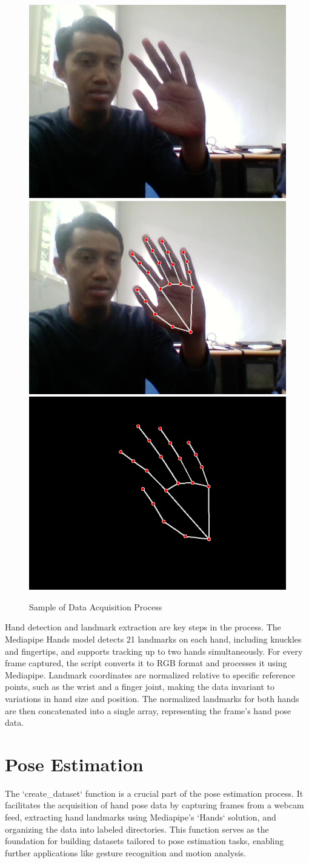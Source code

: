 \begin{figure}[h]
	\centering
	\includegraphics[width=0.3\linewidth]{img/data_cap1} 
	\includegraphics[width=0.3\linewidth]{img/data_cap2}
	\includegraphics[width=0.3\linewidth]{img/data_cap3}
	\caption{Sample of Data Acquisition Process}
	\label{fig:data_acquisition} %
\end{figure}

Hand detection and landmark extraction are key steps in the process. The Mediapipe Hands model detects 21 landmarks on each hand, including knuckles and fingertips, and supports tracking up to two hands simultaneously. For every frame captured, the script converts it to RGB format and processes it using Mediapipe. Landmark coordinates are normalized relative to specific reference points, such as the wrist and a finger joint, making the data invariant to variations in hand size and position. The normalized landmarks for both hands are then concatenated into a single array, representing the frame’s hand pose data.

\section{Pose Estimation}

The `create\_dataset` function is a crucial part of the pose estimation process. It facilitates the acquisition of hand pose data by capturing frames from a webcam feed, extracting hand landmarks using Mediapipe's `Hands` solution, and organizing the data into labeled directories. This function serves as the foundation for building datasets tailored to pose estimation tasks, enabling further applications like gesture recognition and motion analysis.


